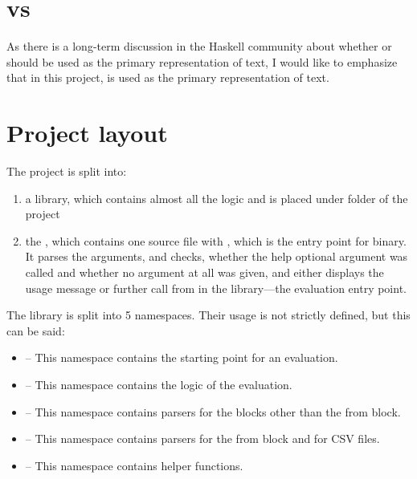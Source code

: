 \section{ vs }
As there is a long-term discussion in the Haskell community about whether  or  should be used as the 
primary representation of text, I would like to emphasize that in this project,  is used as the primary
representation of text.

\section{Project layout}

The project is split into:
\begin{enumerate}
  \item a library, which contains almost all the logic and is placed under
        folder of the project

  \item the , which contains one source file
      with , which is the entry point for  binary. 
      It parses the arguments, and checks, whether the help optional argument was called and whether no argument at all was given, 
     and either displays the usage message or further call  from  in the library---the evaluation entry point.
\end{enumerate}

The library is split into 5 namespaces. Their usage is not strictly defined, but this can be said:
\begin{itemize}
    \item {} -- This namespace contains the starting point for an  evaluation.
    \item {} -- This namespace contains the logic of the evaluation.
    \item {} -- This namespace contains parsers for the blocks other than the from block.
    \item {} -- This namespace contains parsers for the from block and for CSV files.
    \item {} -- This namespace contains helper functions.
\end{itemize}

